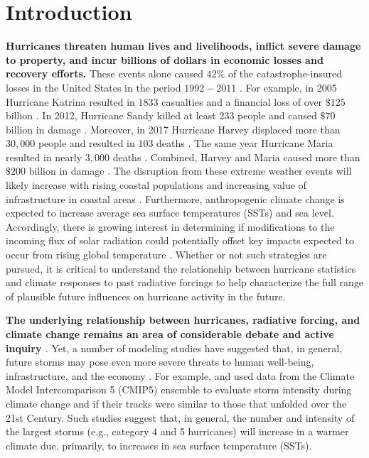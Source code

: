\documentclass[phd,tocprelim]{cornell}
\begin{document}
\section{Introduction}\label{intro}
\par
\textbf{Hurricanes threaten human lives and livelihoods, inflict severe 
damage to property, and incur billions of dollars in economic losses and
recovery efforts.} These events alone caused $42\%$ of the
catastrophe-insured losses in the United States in the period
$1992-2011$ \cite{hodges2017well}. For example, in 2005 Hurricane Katrina
resulted in $1833$ casualties and a financial loss of over $\$125$
billion \cite{hodges2017well}. In 2012, Hurricane Sandy killed at least
233 people and caused $\$70$ billion in damage
\cite{blake2013tropical}. Moreover, in 2017 Hurricane Harvey displaced more
than $30,000$ people and resulted in $103$ deaths
\cite{murphy2018service}. The same year Hurricane Maria resulted in nearly
$3,000$ deaths \cite{maria_rpt}. Combined, Harvey and Maria caused
more than $\$200$ billion in damage \cite{murphy2018service,maria_rpt}. 
The disruption from these extreme weather events
will likely increase with rising coastal populations and increasing
value of infrastructure in coastal areas
\cite{kerry_tc_clim}. Furthermore, anthropogenic climate change is
expected to increase average sea surface temperatures (SSTs)
\cite{ipcc_2007} and sea level. Accordingly, there is growing interest
in determining if modifications to the incoming flux of solar
radiation could potentially offset key impacts expected to occur from
rising global temperature \cite{msadek}. %
Whether or not
such strategies are pursued, it is critical to understand the
relationship between hurricane statistics and climate responses to
past radiative forcings to help characterize the full
range of plausible future influences on hurricane activity in the
future.
\par

\textbf{The underlying relationship between hurricanes, radiative
  forcing, and climate change remains an area of considerable debate
  and active inquiry \cite{ting2015,elsner2006,msadek}}. Yet, a number of 
  modeling studies have suggested that, in general, future storms may pose even
more severe threats to human well-being, infrastructure, and the
economy \cite{IPCC2014c}. For example, \cite{villarini2013} and 
\cite{emanuel12219} used data from the Climate Model Intercomparison 
5 (CMIP5) ensemble to evaluate storm intensity during climate change and 
if their tracks were similar to those that unfolded over the 21st Century. 
Such studies suggest that, in general, the number and intensity of the largest
storms (e.g., category 4 and 5 hurricanes) will increase in a warmer
climate due, primarily, to increases in sea surface temperature
(SSTs). 
\end{document}
